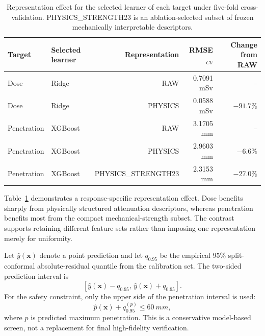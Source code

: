 \documentclass[12pt]{elsarticle}
\newcommand{\SI}[2]{#1~#2}
\newif\ifproductionnotes
\newcommand{\productionnote}[1]{%
\ifproductionnotes
\par\medskip\noindent\fcolorbox{black}{gray!12}{\begin{minipage}{0.94\linewidth}\footnotesize\textbf{Production note for the figure/table designer.} #1\end{minipage}}\par\medskip
\fi}
\begin{document}
	\begin{table}[htbp]
		\centering
		\caption{Representation effect for the selected learner of each target under five-fold cross-validation. PHYSICS\_STRENGTH23 is an ablation-selected subset of frozen mechanically interpretable descriptors.}
		\label{tab:raw_physics}
		\small
		\begin{tabular}{@{}llrrr@{}}
			\toprule
			Target & Selected learner & Representation & RMSE$_{CV}$ & Change from RAW \\
			\midrule
			Dose & Ridge & RAW & 0.7091 mSv & -- \\
			Dose & Ridge & PHYSICS & 0.0588 mSv & $-91.7\%$ \\
			Penetration & XGBoost & RAW & 3.1705 mm & -- \\
			Penetration & XGBoost & PHYSICS & 2.9603 mm & $-6.6\%$ \\
			Penetration & XGBoost & PHYSICS\_STRENGTH23 & 2.3153 mm & $-27.0\%$ \\
			\bottomrule
		\end{tabular}
	\end{table}
	\productionnote{\textbf{Tabela~\ref{tab:raw_physics} e Figura~\ref{fig:physics} --- briefing para Carlos.} Usar \texttt{Fase 3/analise\_desempenho\_modelos (Fase 3) - MCNP63\_DEDF\_AP/raw\_vs\_physics\_paired\_comparison.csv}, \texttt{benchmark\_cv\_summary.csv} e \texttt{benchmark\_cv\_folds.csv}. Construir a figura como gr\'afico de inclina\c{c}\~ao em dois pain\'eis, com os sete aprendizes por alvo e uma faixa adicional para a abla\c{c}\~ao PHYSICS\_STRENGTH23 na penetra\c{c}\~ao. Rotular apenas os modelos selecionados e n\~ao sugerir que todas as transforma\c{c}\~oes melhoram todos os algoritmos.}

	Table~\ref{tab:raw_physics} demonstrates a response-specific representation effect. Dose benefits sharply from physically structured attenuation descriptors, whereas penetration benefits most from the compact mechanical-strength subset. The contrast supports retaining different feature sets rather than imposing one representation merely for uniformity.
	
	Let $\hat{y}(\mathbf{x})$ denote a point prediction and let $q_{0.95}$ be the empirical 95\% split-conformal absolute-residual quantile from the calibration set. The two-sided prediction interval is
	\begin{equation}
		\left[\hat{y}(\mathbf{x})-q_{0.95},\,\hat{y}(\mathbf{x})+q_{0.95}\right].
	\end{equation}
	For the safety constraint, only the upper side of the penetration interval is used:
	\begin{equation}
		\hat{p}(\mathbf{x})+q^{(p)}_{0.95} \leq \SI{60}{mm},
		\label{eq:ballistic_constraint}
	\end{equation}
	where $\hat{p}$ is predicted maximum penetration. This is a conservative model-based screen, not a replacement for final high-fidelity verification.
	
\end{document}
